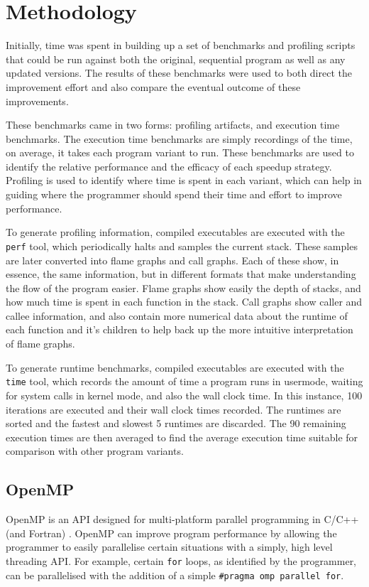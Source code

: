 \documentclass[a4paper]{article}
\begin{document}
    \section{Methodology}
    Initially, time was spent in building up a set of benchmarks and profiling scripts that could be run against both
    the original, sequential program as well as any updated versions. The results of these benchmarks were used to both
    direct the improvement effort and also compare the eventual outcome of these improvements.

    These benchmarks came in two forms: profiling artifacts, and execution time benchmarks. The execution time 
    benchmarks are simply recordings of the time, on average, it takes each program variant to run. These benchmarks
    are used to identify the relative performance and the efficacy of each speedup strategy. Profiling is used to
    identify where time is spent in each variant, which can help in guiding where the programmer should spend their
    time and effort to improve performance.
    
    To generate profiling information, compiled executables are executed with the \texttt{perf} tool, which
    periodically halts and samples the current stack. These samples are later converted into flame graphs and call
    graphs. Each of these show, in essence, the same information, but in different formats that make understanding the
    flow of the program easier. Flame graphs show easily the depth of stacks, and how much time is spent in each
    function in the stack. Call graphs show caller and callee information, and also contain more numerical data about
    the runtime of each function and it's children to help back up the more intuitive interpretation of flame graphs.

    To generate runtime benchmarks, compiled executables are executed with the \texttt{time} tool, which records the
    amount of time a program runs in usermode, waiting for system calls in kernel mode, and also the wall clock time.
    In this instance, 100 iterations are executed and their wall clock times recorded. The runtimes are sorted and
    the fastest and slowest 5 runtimes are discarded. The 90 remaining execution times are then averaged to find the
    average execution time suitable for comparison with other program variants.

        \subsection{OpenMP}
        OpenMP is an API designed for multi-platform parallel programming in C/C++ (and Fortran) \cite{OpenMP}.
        OpenMP can improve program performance by allowing the programmer to easily parallelise certain situations
        with a simply, high level threading API. For example, certain \texttt{for} loops, as identified by the
        programmer, can be parallelised with the addition of a simple \texttt{\#pragma omp parallel for}.
\end{document}
